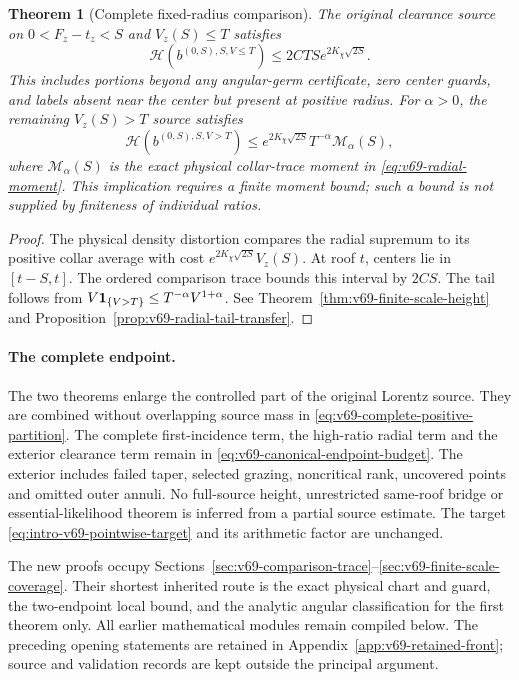 \documentclass[11pt,reqno]{amsart}
\numberwithin{equation}{section}
\newtheorem{leadtheorem}{Theorem}
\theoremstyle{definition}\newtheorem{definition}[theorem]{Definition}
\theoremstyle{remark}\newtheorem{remark}[theorem]{Remark}
\begin{document}
\begin{leadtheorem}[Complete fixed-radius comparison]
\label{thm:intro-v69-full-radius}
The original clearance source on $0<F_z-t_z<S$ and $V_z(S)\le T$
satisfies
\[
 \mathcal H(b^{(0,S),S,V\le T})
             \le2CTS e^{2K_\chi\sqrt{2S}}.
\]
This includes portions beyond any angular-germ certificate, zero
center guards, and labels absent near the center but present at
positive radius. For $\alpha>0$, the remaining $V_z(S)>T$ source
satisfies
\[
 \mathcal H(b^{(0,S),S,V>T})
 \le e^{2K_\chi\sqrt{2S}}T^{-\alpha}\mathcal M_\alpha(S),
\]
where $\mathcal M_\alpha(S)$ is the exact physical collar-trace
moment in \eqref{eq:v69-radial-moment}. This implication requires a
finite moment bound; such a bound is not supplied by finiteness of
individual ratios.
\end{leadtheorem}
\begin{proof}
The physical density distortion compares the radial supremum to its
positive collar average with cost $e^{2K_\chi\sqrt{2S}}V_z(S)$.
At roof $t$, centers lie in $[t-S,t]$. The ordered comparison trace
bounds this interval by $2CS$. The tail follows from
$V\mathbf1_{\{V>T\}}\le T^{-\alpha}V^{1+\alpha}$.
See Theorem~\ref{thm:v69-finite-scale-height} and
Proposition~\ref{prop:v69-radial-tail-transfer}.
\end{proof}

\paragraph{The complete endpoint.}
The two theorems enlarge the controlled part of the original Lorentz
source. They are combined without overlapping source mass in
\eqref{eq:v69-complete-positive-partition}. The complete
first-incidence term, the high-ratio radial term and the exterior
clearance term remain in
\eqref{eq:v69-canonical-endpoint-budget}. The exterior includes
failed taper, selected grazing, noncritical rank, uncovered points
and omitted outer annuli. No full-source height, unrestricted
same-roof bridge or essential-likelihood theorem is inferred from a
partial source estimate. The target \eqref{eq:intro-v69-pointwise-target}
and its arithmetic factor are unchanged.

The new proofs occupy
Sections~\ref{sec:v69-comparison-trace}--\ref{sec:v69-finite-scale-coverage}.
Their shortest inherited route is the exact physical chart and guard,
the two-endpoint local bound, and the analytic angular classification
for the first theorem only. All earlier mathematical modules remain
compiled below. The preceding opening statements are retained in
Appendix~\ref{app:v69-retained-front}; source and validation records
are kept outside the principal argument.
\end{document}
